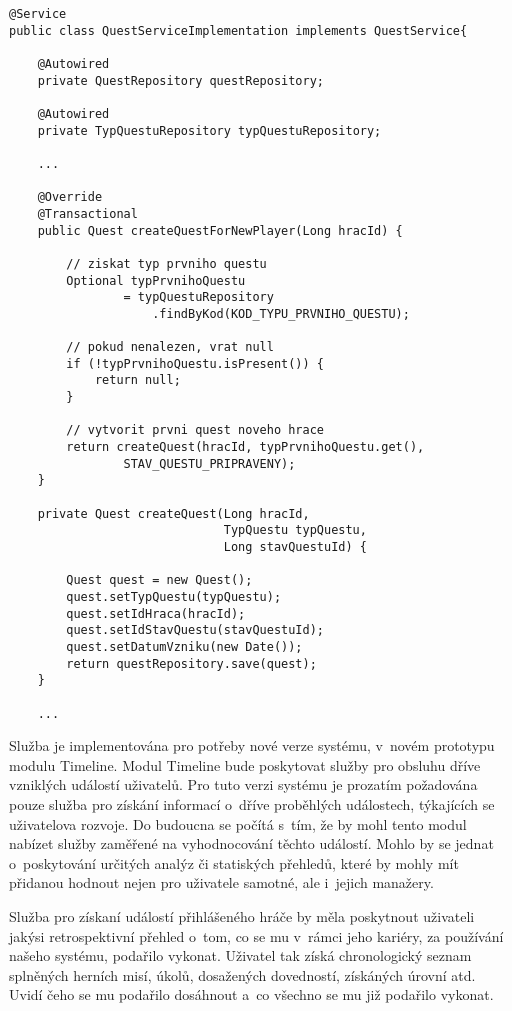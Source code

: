 \documentclass[12pt]{article}
\begin{document}
\begin{lstlisting}
@Service
public class QuestServiceImplementation implements QuestService{
    
    @Autowired
    private QuestRepository questRepository;
    
    @Autowired
    private TypQuestuRepository typQuestuRepository;
    
    ...
    
    @Override
    @Transactional
    public Quest createQuestForNewPlayer(Long hracId) {

        // ziskat typ prvniho questu
        Optional typPrvnihoQuestu
                = typQuestuRepository
                    .findByKod(KOD_TYPU_PRVNIHO_QUESTU);

        // pokud nenalezen, vrat null
        if (!typPrvnihoQuestu.isPresent()) {
            return null;
        }

        // vytvorit prvni quest noveho hrace
        return createQuest(hracId, typPrvnihoQuestu.get(),
                STAV_QUESTU_PRIPRAVENY);
    }
    
    private Quest createQuest(Long hracId,
                              TypQuestu typQuestu,
                              Long stavQuestuId) {

        Quest quest = new Quest();
        quest.setTypQuestu(typQuestu);
        quest.setIdHraca(hracId);
        quest.setIdStavQuestu(stavQuestuId);
        quest.setDatumVzniku(new Date());
        return questRepository.save(quest);
    }
    
    ...

\end{lstlisting}

\clearpage


Služba je implementována pro potřeby nové verze systému, v~novém prototypu modulu Timeline. 
Modul Timeline bude poskytovat služby pro obsluhu dříve vzniklých událostí uživatelů.
Pro tuto verzi systému je prozatím požadována pouze služba pro získání informací o~dříve
proběhlých událostech, týkajících se uživatelova rozvoje.
Do budoucna se počítá s~tím, že by mohl tento modul nabízet služby zaměřené na vyhodnocování těchto událostí.
Mohlo by se jednat o~poskytování určitých analýz či statiských přehledů,
které by mohly mít přidanou hodnout nejen pro uživatele samotné, ale i~jejich manažery.

Služba pro získaní událostí přihlášeného hráče by měla poskytnout
uživateli jakýsi retrospektivní přehled o~tom,
co se mu v~rámci jeho kariéry, za používání našeho systému, podařilo vykonat.
Uživatel tak získá chronologický seznam splněných herních misí, úkolů,
dosažených dovedností, získáných úrovní atd.
Uvidí čeho se mu podařilo dosáhnout a~co všechno se mu již podařilo vykonat.
\end{document}
